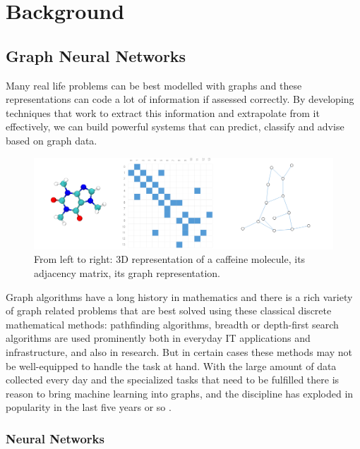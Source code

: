\chapter{Background}

\section{Graph Neural Networks}

	Many real life problems can be best modelled with graphs and these representations can code a lot of information if assessed correctly. By developing techniques that work to extract this information and extrapolate from it effectively, we can build powerful systems that can predict, classify and advise based on graph data.
	
	\begin{figure}[!h]
		\centering
		\includegraphics[width=\textwidth]{figures/molecule.png}
		\caption{From left to right: 3D representation of a caffeine molecule, its adjacency matrix, its graph representation. \cite{sanchez-lengeling2021a}}
	\end{figure}
	
	Graph algorithms have a long history in mathematics and there is a rich variety of graph related problems that are best solved using these classical discrete mathematical methods: pathfinding algorithms, breadth or depth-first search algorithms are used prominently both in everyday IT applications and infrastructure, and also in research. But in certain cases these methods may not be well-equipped to handle the task at hand. With the large amount of data collected every day and the specialized tasks that need to be fulfilled there is reason to bring machine learning into graphs, and the discipline has exploded in popularity in the last five years or so \cite{gaudelet2021utilizing}.

	\subsection{Neural Networks}
	
